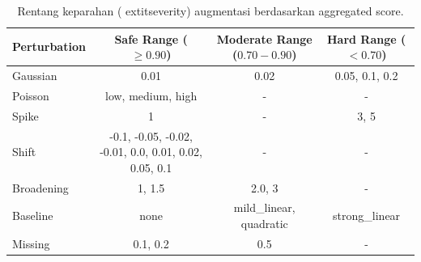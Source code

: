 \begin{table}[H]
\centering
\caption{Rentang keparahan (	extit{severity}) augmentasi berdasarkan aggregated score.}
\label{tab:aug_thresholds}
\begin{tabular}{lccc}
\toprule
\textbf{Perturbation} & \textbf{Safe Range} (${\ge} 0.90$) & \textbf{Moderate Range} ($0.70{-}0.90$) & \textbf{Hard Range} ($< 0.70$) \\
\midrule
Gaussian & 0.01 & 0.02 & 0.05, 0.1, 0.2 \\
Poisson & low, medium, high & - & - \\
Spike & 1 & - & 3, 5 \\
Shift & -0.1, -0.05, -0.02, -0.01, 0.0, 0.01, 0.02, 0.05, 0.1 & - & - \\
Broadening & 1, 1.5 & 2.0, 3 & - \\
Baseline & none & mild_linear, quadratic & strong_linear \\
Missing & 0.1, 0.2 & 0.5 & - \\
\bottomrule
\end{tabular}
\end{table}
